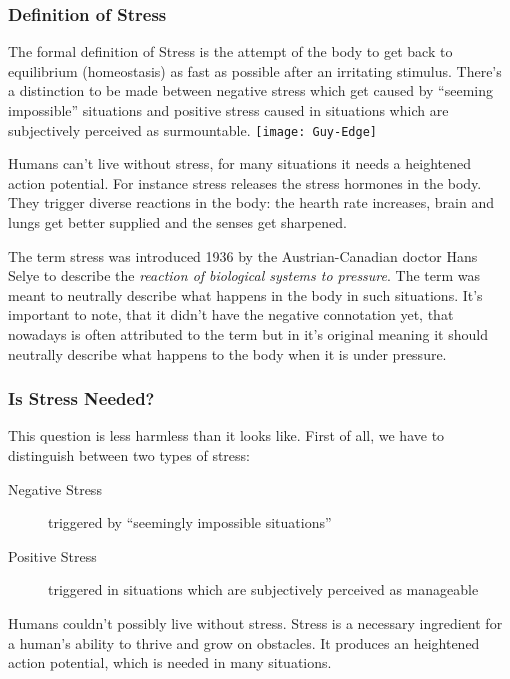 \documentclass[../main.tex]{subfiles}
\begin{document}
\subsubsection{Definition of Stress}
The formal definition of Stress is the attempt of the body to get back to equilibrium (homeostasis) as fast as possible after an irritating stimulus.
There's a distinction to be made between negative stress which get caused by ``seeming impossible''
 situations and positive stress caused in situations which are subjectively perceived as surmountable.
\texttt{[image: Guy-Edge]}

Humans can't live without stress, for many situations it needs a heightened action potential. For instance stress releases the stress hormones in the body. They trigger diverse reactions in the body: the hearth rate increases, brain and lungs get better supplied and the senses get sharpened.

The term stress was introduced 1936 by the Austrian-Canadian doctor Hans Selye to describe the \emph{reaction of biological systems to pressure}. The term was meant to neutrally describe what happens in the body in such situations.
It's important to note, that it didn't have the negative connotation yet, that nowadays is often attributed to the term but in it's original meaning it should neutrally describe what happens to the body when it is under pressure.

\subsubsection{Is Stress Needed?}

This question is less harmless than it looks like. First of all, we have to distinguish between two types of stress:
	\begin{description}
		\item[Negative Stress] triggered by ``seemingly impossible situations''
		\item[Positive Stress] triggered in situations which are subjectively perceived as manageable
	\end{description}
	
Humans couldn't possibly live without stress. Stress is a necessary ingredient for a human's ability to thrive and grow on obstacles. It produces an heightened action potential, which is needed in many situations.
\end{document}
